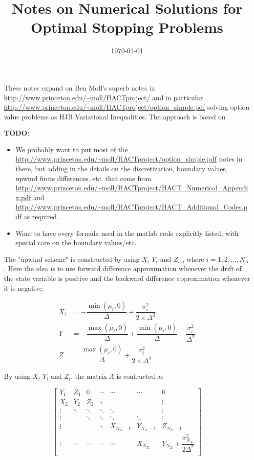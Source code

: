 \documentclass[11pt]{etk-article}
\begin{document}
\title{Notes on Numerical Solutions for Optimal Stopping Problems}
\date{\today}
\maketitle
These notes expand on Ben Moll's superb notes in \url{http://www.princeton.edu/~moll/HACTproject/} and in particular \url{http://www.princeton.edu/~moll/HACTproject/option_simple.pdf} solving option value problems as HJB Variational Inequalities.  The approach is based on \cite{HuangPang1998}

\textbf{TODO:}
\begin{itemize}
	\item We probably want to put most of the \url{http://www.princeton.edu/~moll/HACTproject/option_simple.pdf} notes in there, but adding in the details on the discretization, boundary values, upwind finite differences, etc. that come from \url{http://www.princeton.edu/~moll/HACTproject/HACT_Numerical_Appendix.pdf} and \url{http://www.princeton.edu/~moll/HACTproject/HACT_Additional_Codes.pdf} as required.
	\item Want to have every formula used in the matlab code explicitly listed, with special care on the boundary values/etc.
\end{itemize}

The "upwind scheme" is constructed by using $X_i$ $Y_i$ and $Z_i$ , where $i = 1, 2, ... , N_X$. Here the idea is to use forward difference approximation whenever the drift of the state variable is positive and the backward difference approximation whenever it is negative.

\begin{align}
	X_i &= - \dfrac{\min ( \mu_i , 0 )}{\Delta} + \dfrac{\sigma_i^{2}}{2 \times \Delta^{2}} \\
	Y &= - \dfrac{\max ( \mu_i , 0)}{\Delta} + \dfrac{\min ( \mu_i , 0)}{\Delta} - \dfrac{\sigma_i^{2}}{\Delta^{2}} \\
	Z &= \dfrac{\max ( \mu_i , 0)}{\Delta} + \dfrac{\sigma_i^{2}}{2\times \Delta^{2}}
\end{align}


By using $X_i$ $Y_i$ and $Z_i$, the matrix $A$ is contructed as 

\begin{equation}
\begin{bmatrix}
Y_1 & Z_1 & 0 & \cdots & \cdots & \cdots & 0 \\
X_2 & Y_2 & Z_2 & \ddots & & & \vdots \\
\vdots & \ddots & \ddots & \ddots & \ddots &  & \vdots \\
\vdots & &\ddots & \ddots & \ddots & \ddots  & \vdots \\
\vdots & & & \ddots & X_{N_X-1} & Y_{N_X-1}  & Z_{N_X-1} \\
\vdots & \cdots & \cdots & \cdots & \cdots & X_{N_X} & Y_{N_X}+\dfrac{\sigma_{N_X}^2}{2\Delta^2}\\
\end{bmatrix}
\end{equation}
\end{document}
